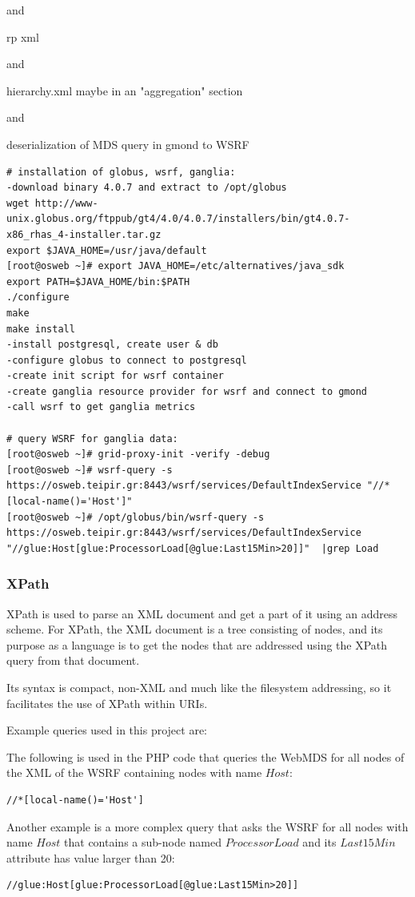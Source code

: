 and

rp xml

and

hierarchy.xml maybe in an "aggregation" section

and

deserialization of MDS query in gmond to WSRF
 
\begin{verbatim}
# installation of globus, wsrf, ganglia:
-download binary 4.0.7 and extract to /opt/globus
wget http://www-unix.globus.org/ftppub/gt4/4.0/4.0.7/installers/bin/gt4.0.7-x86_rhas_4-installer.tar.gz
export $JAVA_HOME=/usr/java/default
[root@osweb ~]# export JAVA_HOME=/etc/alternatives/java_sdk
export PATH=$JAVA_HOME/bin:$PATH
./configure
make
make install
-install postgresql, create user & db
-configure globus to connect to postgresql
-create init script for wsrf container
-create ganglia resource provider for wsrf and connect to gmond
-call wsrf to get ganglia metrics

# query WSRF for ganglia data:
[root@osweb ~]# grid-proxy-init -verify -debug
[root@osweb ~]# wsrf-query -s https://osweb.teipir.gr:8443/wsrf/services/DefaultIndexService "//*[local-name()='Host']"
[root@osweb ~]# /opt/globus/bin/wsrf-query -s https://osweb.teipir.gr:8443/wsrf/services/DefaultIndexService "//glue:Host[glue:ProcessorLoad[@glue:Last15Min>20]]"  |grep Load
\end{verbatim}

\newpage
\subsubsection{XPath}

XPath is used to parse an XML document and get a part of it using an address scheme. For XPath, the XML document is a tree consisting of nodes, and its purpose as a language is to get the nodes that are addressed using the XPath query from that document.

Its syntax is compact, non-XML and much like the filesystem addressing, so it facilitates the use of XPath within URIs.

Example queries used in this project are:

The following is used in the PHP code that queries the WebMDS for all nodes of the XML of the WSRF containing nodes with name $Host$:
\begin{verbatim}
//*[local-name()='Host']
\end{verbatim}

Another example is a more complex query that asks the WSRF for all nodes with name $Host$ that contains a sub-node named $ProcessorLoad$ and its $Last15Min$ attribute has value larger than 20:
\begin{verbatim}
//glue:Host[glue:ProcessorLoad[@glue:Last15Min>20]]
\end{verbatim}

